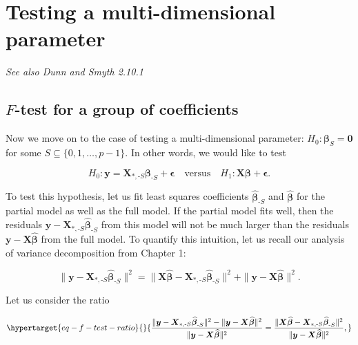 \documentclass[
  11pt,
  letterpaper,
  oneside]{book}
\theoremstyle{plain}
\theoremstyle{plain}
\theoremstyle{definition}
\theoremstyle{definition}
\theoremstyle{plain}
\theoremstyle{remark}
\begin{document}
\hypertarget{sec-multi-dim-testing}{%
\section{Testing a multi-dimensional
parameter}\label{sec-multi-dim-testing}}

\emph{See also Dunn and Smyth 2.10.1}

\hypertarget{f-test-for-a-group-of-coefficients}{%
\subsection{\texorpdfstring{\(F\)-test for a group of
coefficients}{F-test for a group of coefficients}}\label{f-test-for-a-group-of-coefficients}}

Now we move on to the case of testing a multi-dimensional parameter:
\(H_0: \boldsymbol{\beta}_S = \boldsymbol{0}\) for some
\(S \subseteq \{0, 1, \dots, p-1\}\). In other words, we would like to
test

\[
H_0: \boldsymbol{y} = \boldsymbol{X}_{*, \text{-}S} \boldsymbol{\beta}_{\text{-}S} + \boldsymbol{\epsilon} \quad \text{versus} \quad H_1: \boldsymbol{X} \boldsymbol{\beta} + \boldsymbol{\epsilon}.
\]

To test this hypothesis, let us fit least squares coefficients
\(\boldsymbol{\widehat{\beta}}_{\text{-}S}\) and
\(\boldsymbol{\widehat{\beta}}\) for the partial model as well as the
full model. If the partial model fits well, then the residuals
\(\boldsymbol{y} - \boldsymbol{X}_{*, \text{-}S} \boldsymbol{\widehat{\beta}}_{\text{-}S}\)
from this model will not be much larger than the residuals
\(\boldsymbol{y} - \boldsymbol{X} \boldsymbol{\widehat{\beta}}\) from
the full model. To quantify this intuition, let us recall our analysis
of variance decomposition from Chapter 1:

\[
\|\boldsymbol{y} - \boldsymbol{X}_{*, \text{-}S} \boldsymbol{\widehat{\beta}}_{\text{-}S}\|^2 = \|\boldsymbol{X} \boldsymbol{\widehat{\beta}} - \boldsymbol{X}_{*, \text{-}S} \boldsymbol{\widehat{\beta}}_{\text{-}S}\|^2 + \|\boldsymbol{y} - \boldsymbol{X} \boldsymbol{\widehat{\beta}}\|^2.
\]

Let us consider the ratio

\begin{equation}\protect\hypertarget{eq-f-test-ratio}{}{
\frac{\|\boldsymbol{y} - \boldsymbol{X}_{*, \text{-}S} \boldsymbol{\widehat{\beta}}_{\text{-}S}\|^2 - \|\boldsymbol{y} - \boldsymbol{X} \boldsymbol{\widehat{\beta}}\|^2}{\|\boldsymbol{y} - \boldsymbol{X} \boldsymbol{\widehat{\beta}}\|^2} = \frac{\|\boldsymbol{X} \boldsymbol{\widehat{\beta}} - \boldsymbol{X}_{*, \text{-}S} \boldsymbol{\widehat{\beta}}_{\text{-}S}\|^2}{\|\boldsymbol{y} - \boldsymbol{X} \boldsymbol{\widehat{\beta}}\|^2},
}\label{eq-f-test-ratio}\end{equation}
\end{document}
